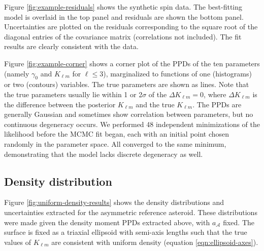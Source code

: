 \documentclass[fleqn,usenatbib]{mnras}
\begin{document}
Figure \ref{fig:example-residuals} shows the synthetic spin data. The best-fitting model is overlaid in the top panel and residuals are shown the bottom panel. Uncertainties are plotted on the residuals corresponding to the square root of the diagonal entries of the covariance matrix (correlations not included). The fit results are clearly consistent with the data.

Figure \ref{fig:example-corner} shows a corner plot of the PPDs of the ten parameters (namely $\gamma_0$ and $K_{\ell m}$ for $\ell \leq 3$), marginalized to functions of one (histograms) or two (contours) variables. The true parameters are shown as lines. Note that the true parameters usually lie within 1 or 2$\sigma$ of the $\Delta K_{\ell m} = 0$, where $\Delta K_{\ell m}$ is the difference between the posterior $K_{\ell m}$ and the true $K_{\ell m}$. The PPDs are generally Gaussian and sometimes show correlation between parameters, but no continuous degeneracy occurs. We performed 48 independent minimizations of the likelihood before the MCMC fit began, each with an initial point chosen randomly in the parameter space. All converged to the same minimum, demonstrating that the model lacks discrete degeneracy as well.



\subsection{Density distribution}
\label{sec:asym-density}
Figure \ref{fig:uniform-density-results} shows the density distributions and uncertainties extracted for the asymmetric reference asteroid. These distributions were made given the density moment PPDs extracted above, with $a_\mathcal{A}$ fixed. The surface is fixed as a triaxial ellipsoid with semi-axis lengths such that the true values of $K_{\ell m}$ are consistent with uniform density (equation \ref{eqn:ellipsoid-axes}).
\end{document}

